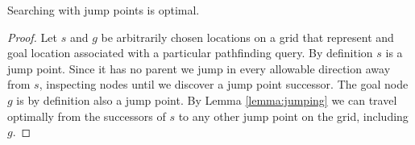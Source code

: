 \begin{theorem}
\label{theorem:jumpoptimal}
Searching with jump points is optimal.
\end{theorem}
\begin{proof}
Let $s$ and $g$ be arbitrarily chosen locations on a grid that represent
and goal location associated with a particular pathfinding query.
By definition $s$ is a jump point. Since it has no parent we jump in every 
allowable direction away from $s$, inspecting nodes until we discover a jump point 
successor. 
The goal node $g$ is by definition also a jump point.
By Lemma \ref{lemma:jumping} we can travel optimally from the
successors of $s$ to any other jump point on the grid, including $g$.
\end{proof}


